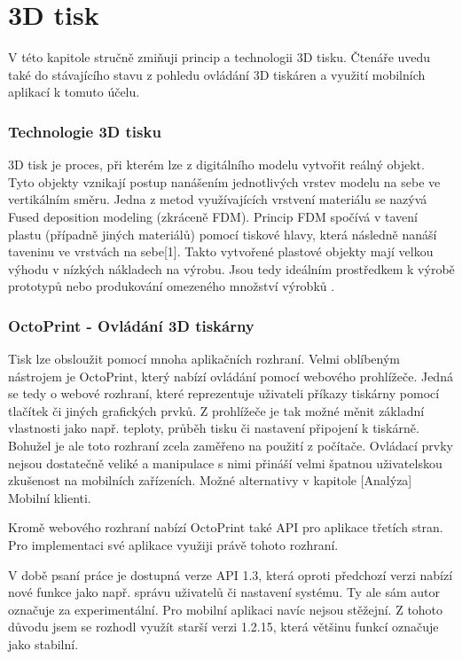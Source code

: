 \chapter{3D tisk}

V této kapitole stručně zmiňuji princip a technologii 3D tisku.
Čtenáře uvedu také do stávajícího stavu z pohledu ovládání 3D tiskáren a využití mobilních aplikací k tomuto účelu.

\subsection{Technologie 3D tisku}

3D tisk je proces, při kterém lze z digitálního modelu vytvořit reálný objekt.
Tyto objekty vznikají postup nanášením jednotlivých vrstev modelu na sebe ve vertikálním směru.
Jedna z metod využívajících vrstvení materiálu se nazývá Fused deposition modeling (zkráceně FDM).
Princip FDM spočívá v tavení plastu (případně jiných materiálů) pomocí tiskové hlavy, která následně nanáší taveninu ve vrstvách na sebe[1].
Takto vytvořené plastové objekty mají velkou výhodu v nízkých nákladech na výrobu.
Jsou tedy ideálním prostředkem k výrobě prototypů nebo produkování omezeného množství výrobků \cite{3dprint-for-prototyping}.

\subsection{OctoPrint - Ovládání 3D tiskárny}

Tisk lze obsloužit pomocí mnoha aplikačních rozhraní.
Velmi oblíbeným nástrojem je OctoPrint, který nabízí ovládání pomocí webového prohlížeče.
Jedná se tedy o webové rozhraní, které reprezentuje uživateli příkazy tiskárny pomocí tlačítek či jiných grafických prvků.
Z prohlížeče je tak možné měnit základní vlastnosti jako např. teploty, průběh tisku či nastavení připojení k tiskárně.
Bohužel je ale toto rozhraní zcela zaměřeno na použití z počítače.
Ovládací prvky nejsou dostatečně veliké a manipulace s nimi přináší velmi špatnou uživatelskou zkušenost na mobilních zařízeních.
Možné alternativy v kapitole [Analýza] Mobilní klienti.

Kromě webového rozhraní nabízí OctoPrint také API pro aplikace třetích stran.
Pro implementaci své aplikace využiji právě tohoto rozhraní.

V době psaní práce je dostupná verze API 1.3, která oproti předchozí verzi nabízí nové funkce jako např. správu uživatelů či nastavení systému.
Ty ale sám autor označuje za experimentální.
Pro mobilní aplikaci navíc nejsou stěžejní.
Z tohoto důvodu jsem se rozhodl využít starší verzi 1.2.15, která většinu funkcí označuje jako stabilní.

